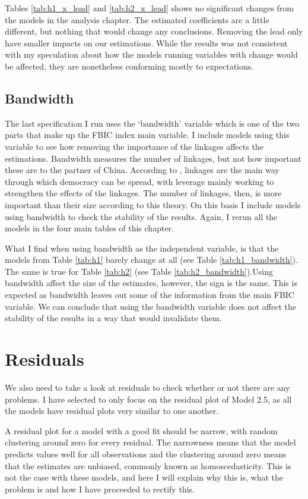 Tables \ref{tab:h1_x_lead} and \ref{tab:h2_x_lead} shows no significant changes from the models in the analysis chapter. The estimated coefficients are a little different, but nothing that would change any conclusions. Removing the lead only have smaller impacts on our estimations. While the results was not consistent with my speculation about how the models running variables with change would be affected, they are nonetheless conforming mostly to expectations.


\subsection{Bandwidth}
The last specification I run uses the `bandwidth' variable which is one of the two parts that make up the FBIC index main variable. I include models using this variable to see how removing the importance of the linkages affects the estimations. Bandwidth measures the number of linkages, but not how important these are to the partner of China. According to \citet{levitsky_linkage_2006}, linkages are the main way through which democracy can be spread, with leverage mainly working to strengthen the effects of the linkages. The number of linkages, then, is more important than their size according to this theory. On this basis I include models using bandwidth to check the stability of the results. Again, I rerun all the models in the four main tables of this chapter.

What I find when using bandwidth as the independent variable, is that the models from Table \ref{tab:h1} barely change at all (see Table \ref{tab:h1_bandwidth}). The same is true for Table \ref{tab:h2} (see Table \ref{tab:h2_bandwidth}).Using bandwidth affect the size of the estimates, however, the sign is the same. This is expected as bandwidth leaves out some of the information from the main FBIC variable. We can conclude that using the bandwidth variable does not affect the stability of the results in a way that would invalidate them. 

\section{Residuals}
We also need to take a look at residuals to check whether or not there are any problems. I have selected to only focus on the residual plot of Model 2.5, as all the models have residual plots very similar to one another.

A residual plot for a model with a good fit should be narrow, with random clustering around zero for every residual. The narrowness means that the model predicts values well for all observations and the clustering around zero means that the estimates are unbiased, commonly known as homoscedasticity. This is not the case with these models, and here I will explain why this is, what the problem is and how I have proceeded to rectify this.

